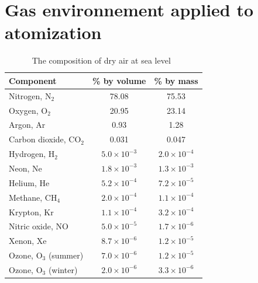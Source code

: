 \documentclass[final,5p,times,twocolumn]{elsarticle}
\begin{document}











\appendix
\section{Gas environnement applied to atomization}
\label{a:gas_environment}

\vspace{0mm}
\begin{table}[H]
    \centering
    \begin{tabular}{l c c}
        \toprule
        \textbf{Component} & \textbf{\% by volume} & \textbf{\% by mass} \\
        \midrule
        Nitrogen, N$_2$ & 78.08 & 75.53 \\
        Oxygen, O$_2$ & 20.95 & 23.14 \\
        Argon, Ar & 0.93 & 1.28 \\
        Carbon dioxide, CO$_2$ & 0.031 & 0.047 \\
        Hydrogen, H$_2$ & $5.0 \times 10^{-3}$ & $2.0 \times 10^{-4}$ \\
        Neon, Ne & $1.8 \times 10^{-3}$ & $1.3 \times 10^{-3}$ \\
        Helium, He & $5.2 \times 10^{-4}$ & $7.2 \times 10^{-5}$ \\
        Methane, CH$_4$ & $2.0 \times 10^{-4}$ & $1.1 \times 10^{-4}$ \\
        Krypton, Kr & $1.1 \times 10^{-4}$ & $3.2 \times 10^{-4}$ \\
        Nitric oxide, NO & $5.0 \times 10^{-5}$ & $1.7 \times 10^{-6}$ \\
        Xenon, Xe & $8.7 \times 10^{-6}$ & $1.2 \times 10^{-5}$ \\
        Ozone, O$_3$ (summer) & $7.0 \times 10^{-6}$ & $1.2 \times 10^{-5}$ \\
        Ozone, O$_3$ (winter) & $2.0 \times 10^{-6}$ & $3.3 \times 10^{-6}$ \\
        \bottomrule
    \end{tabular}
    \caption{The composition of dry air at sea level~\cite{Atkins2022AtkinsPhysical}}
    \label{t:air_composition}
\end{table}
\FloatBarrier
\vspace{0mm}




 



% 
\end{document}
